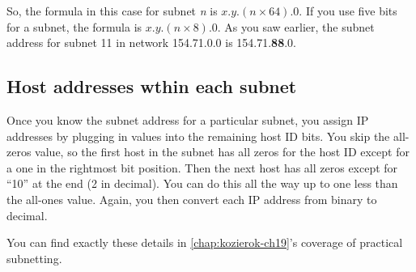 So, the formula in this case for subnet \emph{n} is $x$.$y$.$(n\times 64)$.0.
If you use five bits for a subnet, the formula is $x$.$y$.$(n\times 8)$.0.
As you saw earlier, the subnet address for subnet 11 in network 154.71.0.0 is 154.71.\textbf{88}.0.



\subsection{Host addresses wthin each subnet}

Once you know the subnet address for a particular subnet, you assign IP
addresses by plugging in values into the remaining host ID bits. You
skip the all-zeros value, so the first host in the subnet has all zeros
for the host ID except for a one in the rightmost bit position. Then the
next host has all zeros except for ``10'' at the end (2 in decimal). You
can do this all the way up to one less than the all-ones value. Again,
you then convert each IP address from binary to decimal.

\begin{note}
You can find exactly these details in \cref{chap:kozierok-ch19}'s coverage of practical subnetting.
\end{note}




